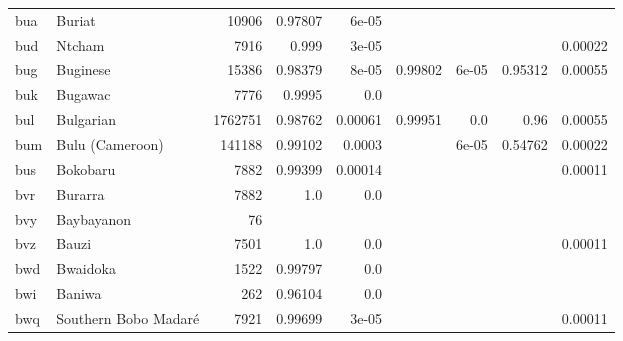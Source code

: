 \documentclass[11pt]{article}
\begin{document}
\begin{table*}[h]
{\begin{tabular}{llrrrrrrr}
bua         & Buriat         & 10906         & 0.97807         & 6e-05         &          &          &          &          \\

bud         & Ntcham         & 7916         & 0.999         & 3e-05         &          &          &          & 0.00022         \\

bug         & Buginese         & 15386         & 0.98379         & 8e-05         & 0.99802         & 6e-05         & 0.95312         & 0.00055         \\

buk         & Bugawac         & 7776         & 0.9995         & 0.0         &          &          &          &          \\

bul         & Bulgarian         & 1762751         & 0.98762         & 0.00061         & 0.99951         & 0.0         & 0.96         & 0.00055         \\

bum         & Bulu (Cameroon)         & 141188         & 0.99102         & 0.0003         &          & 6e-05         & 0.54762         & 0.00022         \\

bus         & Bokobaru         & 7882         & 0.99399         & 0.00014         &          &          &          & 0.00011         \\

bvr         & Burarra         & 7882         & 1.0         & 0.0         &          &          &          &          \\

bvy         & Baybayanon         & 76         &          &          &          &          &          &          \\

bvz         & Bauzi         & 7501         & 1.0         & 0.0         &          &          &          & 0.00011         \\

bwd         & Bwaidoka         & 1522         & 0.99797         & 0.0         &          &          &          &          \\

bwi         & Baniwa         & 262         & 0.96104         & 0.0         &          &          &          &          \\

bwq         & Southern Bobo Madaré         & 7921         & 0.99699         & 3e-05         &          &          &          & 0.00011         \\


\end{tabular}}
\end{table*}
\end{document}
